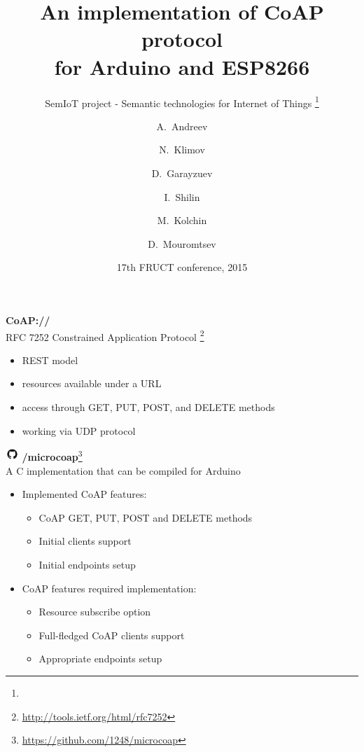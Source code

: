 \documentclass{beamer}
\title{An implementation of CoAP protocol\\ for Arduino and ESP8266}
\subtitle{
    SemIoT project - Semantic technologies for Internet of Things
    \footnote{\semioturl}
}
\author{
    A.~Andreev
    \and
    N.~Klimov
    \and
    D.~Garayzuev
    \and
    I.~Shilin
    \and
    M.~Kolchin
    \and
    D.~Mouromtsev
}
\institute[NRU ITMO] %
{
    ITMO University, St.Petersburg, Russia
}
\date{17th FRUCT conference, 2015}
\begin{document}
    \begin{frame}
        \titlepage
    \end{frame}

    \begin{frame}
        \begin{center}
            \begin{multicols}{2}
                \huge{\textbf{CoAP://}}\\
                \large{RFC 7252 Constrained Application Protocol}
                \footnote{\url{http://tools.ietf.org/html/rfc7252}}
            \end{multicols}
        \end{center}
        \begin{itemize}
            \item REST model
            \item resources available under a URL
            \item access through GET, PUT, POST, and DELETE methods
            \item working via UDP protocol
        \end{itemize}
    \end{frame}

    \begin{frame}
        \begin{multicols}{2}
            \includegraphics[height=0.5cm,keepaspectratio]{github}
            \huge{\textbf{/microcoap}}\large{\footnote{\url{https://github.com/1248/microcoap}}}\\
            \large{A C implementation that can be compiled for Arduino}
        \end{multicols}
        \begin{itemize}
            \item Implemented CoAP features:
                \begin{itemize}
                    \item CoAP GET, PUT, POST and DELETE methods
                    \item Initial clients support
                    \item Initial endpoints setup
                \end{itemize}
            \item CoAP features required implementation:
                \begin{itemize}
                    \item Resource subscribe option
                    \item Full-fledged CoAP clients support
                    \item Appropriate endpoints setup
                \end{itemize}
        \end{itemize}
    \end{frame}
    
\end{document}

